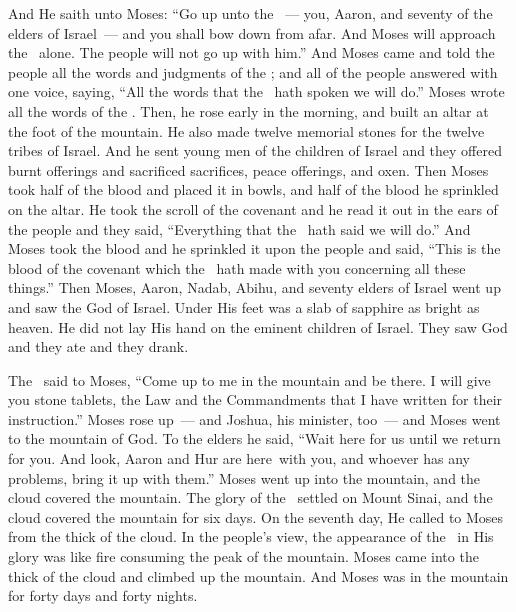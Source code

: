 
\begin{inparaenum}
   And He saith unto Moses: ``Go up unto the \lord~--- you, Aaron, and seventy of the elders of Israel~--- and you shall bow down from afar.%
   And Moses will approach the \lord\ alone. The people will not go up with him.''%
   And Moses came and told the people all the words and judgments of the \lord; and all of the people answered with one voice, saying, ``All the words that the \lord\ hath spoken we will do.''%
   Moses wrote all the words of the \lord. Then, he rose early in the morning, and built an altar at the foot of the mountain. He also made twelve memorial stones for the twelve tribes of Israel.%
   And he sent young men of the children of Israel and they offered burnt offerings and sacrificed sacrifices, peace offerings, and oxen.%
   Then Moses took half of the blood and placed it in bowls, and half of the blood he sprinkled on the altar.%
   He took the scroll of the covenant and he read it out in the ears of the people and they said, ``Everything that the \lord\ hath said we will do.''%
   And Moses took the blood and he sprinkled it upon the people and said, ``This is the blood of the covenant which the \lord\ hath made with you concerning all these things.''%
   Then Moses, Aaron, Nadab, Abihu, and seventy elders of Israel went up%
   and saw the God of Israel. Under His feet was a slab of sapphire as bright as heaven.%
   He did not lay His hand on the eminent children of Israel. They saw God and they ate and they drank.%
  
   The \lord\ said to Moses, ``Come up to me in the mountain and be there. I will give you stone tablets, the Law and the Commandments that I have written for their instruction.''%
   Moses rose up~--- and Joshua, his minister, too~--- and Moses went to the mountain of God.%
   To the elders he said, ``Wait here for us until we return for you. And look, Aaron and Hur are here\understood\ with you, and whoever has any problems, bring it up with them.''%
   Moses went up into the mountain, and the cloud covered the mountain.%
   The glory of the \lord\ settled on Mount Sinai, and the cloud covered the mountain for six days. On the seventh day, He called to Moses from the thick of the cloud.%
   In the people's view, the appearance of the \lord\ in His glory was like fire consuming the peak of the mountain.%
   Moses came into the thick of the cloud and climbed up the mountain. And Moses was in the mountain for forty days and forty nights.%
\end{inparaenum}
